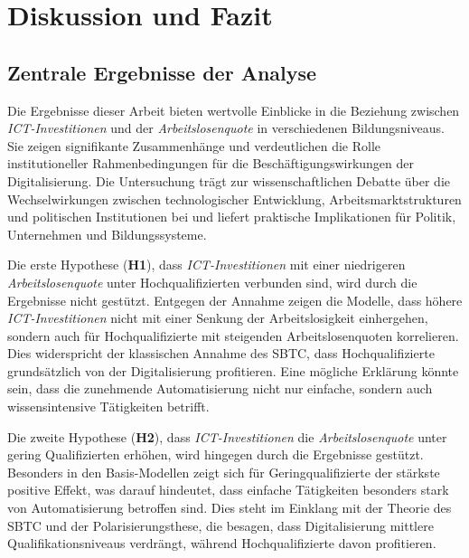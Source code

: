 
\section{Diskussion und Fazit}


\subsection{Zentrale Ergebnisse der Analyse}

Die Ergebnisse dieser Arbeit bieten wertvolle Einblicke in die Beziehung zwischen 
\textit{\ac{ICT}-Investitionen} und der \textit{Arbeitslosenquote} in verschiedenen 
Bildungsniveaus. Sie zeigen signifikante Zusammenhänge und verdeutlichen die Rolle 
institutioneller Rahmenbedingungen für die Beschäftigungswirkungen der Digitalisierung. Die 
Untersuchung trägt zur wissenschaftlichen Debatte über die Wechselwirkungen zwischen 
technologischer Entwicklung, Arbeitsmarktstrukturen und politischen Institutionen bei und liefert 
praktische Implikationen für Politik, Unternehmen und Bildungssysteme. 

Die erste Hypothese (\textbf{H1}), dass \textit{\ac{ICT}-Investitionen} mit einer niedrigeren 
\textit{Arbeitslosenquote} unter Hochqualifizierten verbunden sind, wird durch die Ergebnisse 
nicht gestützt. Entgegen der Annahme zeigen die Modelle, dass höhere 
\textit{\ac{ICT}-Investitionen} nicht mit einer Senkung der Arbeitslosigkeit einhergehen, sondern 
auch für Hochqualifizierte mit steigenden Arbeitslosenquoten korrelieren. Dies widerspricht der 
klassischen Annahme des \ac{SBTC}, dass Hochqualifizierte grundsätzlich von der Digitalisierung 
profitieren. Eine mögliche Erklärung könnte sein, dass die zunehmende Automatisierung nicht nur 
einfache, sondern auch wissensintensive Tätigkeiten betrifft. 

Die zweite Hypothese (\textbf{H2}), dass \textit{\ac{ICT}-Investitionen} die 
\textit{Arbeitslosenquote} unter gering Qualifizierten erhöhen, wird hingegen durch die 
Ergebnisse gestützt. Besonders in den Basis-Modellen zeigt sich für Geringqualifizierte der 
stärkste positive Effekt, was darauf hindeutet, dass einfache Tätigkeiten besonders stark von 
Automatisierung betroffen sind. Dies steht im Einklang mit der Theorie des \ac{SBTC} und der 
Polarisierungsthese, die besagen, dass Digitalisierung mittlere Qualifikationsniveaus verdrängt, 
während Hochqualifizierte davon profitieren.

